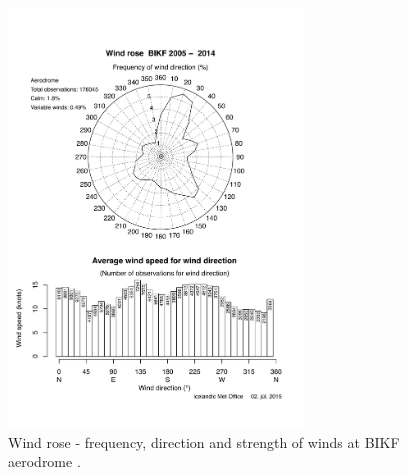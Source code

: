 \begin{figure}[h]
    \centering
    \includegraphics[width=0.7\textwidth]{graphics/BIKF_windrose_2005-2014.pdf}
    \caption[BIKF Wind Rose]{Wind rose - frequency, direction and strength of winds at BIKF aerodrome \cite{wind_rose_2014}.}
    \label{fig:BIKF_wind_rose}
\end{figure}




